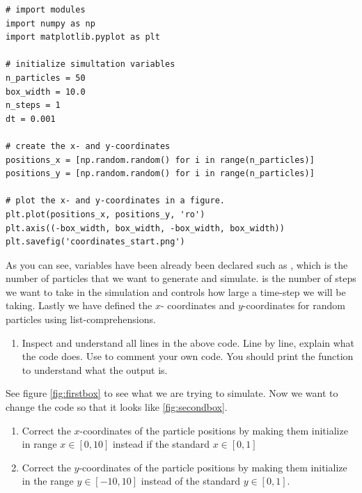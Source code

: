 \documentclass{article}
\begin{document}
\begin{lstlisting}
# import modules
import numpy as np
import matplotlib.pyplot as plt

# initialize simultation variables
n_particles = 50
box_width = 10.0
n_steps = 1
dt = 0.001

# create the x- and y-coordinates
positions_x = [np.random.random() for i in range(n_particles)]
positions_y = [np.random.random() for i in range(n_particles)]

# plot the x- and y-coordinates in a figure.
plt.plot(positions_x, positions_y, 'ro')
plt.axis((-box_width, box_width, -box_width, box_width))
plt.savefig('coordinates_start.png')
\end{lstlisting}

As you can see, variables have been already been declared such as , which is the number of particles that we want to generate and simulate.
 is the number of steps we want to take in the simulation and  controls how large a time-step we will be taking.
Lastly we have defined the $x$- coordinates and $y$-coordinates for  random particles using list-comprehensions.

\begin{enumerate}
  \item Inspect and understand all lines in the above code.
        Line by line, explain what the code does. Use \code{\#} to comment your own code.
        You should print the  function to understand what the output is.
\end{enumerate}

See figure \ref{fig:firstbox} to see what we are trying to simulate.
Now we want to change the code so that it looks like \ref{fig:secondbox}.

\begin{enumerate}
  \item Correct the $x$-coordinates of the particle positions by making them initialize in range $x \in [0, 10]$ instead if the standard $x \in [0,1]$
  \item Correct the $y$-coordinates of the particle positions by making them initialize in the range $y \in [-10,10]$ instead of the standard $y \in [0,1]$.
\end{enumerate}
\end{document}
